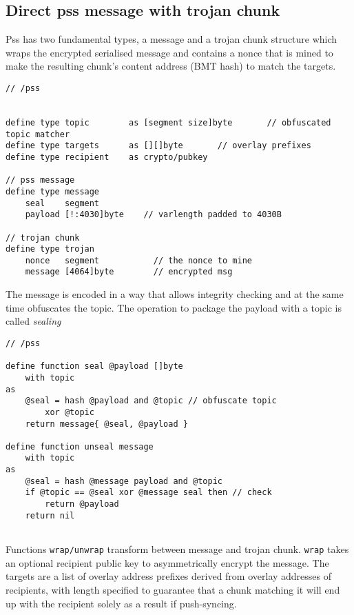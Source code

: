 \subsection{Direct pss message with trojan chunk}

Pss has two fundamental types, a message and a trojan chunk structure which wraps the encrypted serialised message and contains a nonce that is mined to make the resulting chunk's content address (BMT hash) to match the targets.


\begin{definition}\label{def:pss-message}
\begin{lstlisting}[language=buzz1]
// /pss


define type topic        as [segment size]byte       // obfuscated topic matcher
define type targets      as [][]byte       // overlay prefixes 
define type recipient    as crypto/pubkey

// pss message
define type message 
    seal    segment            
    payload [!:4030]byte    // varlength padded to 4030B
    
// trojan chunk
define type trojan 
    nonce   segment           // the nonce to mine 
    message [4064]byte        // encrypted msg 
\end{lstlisting}
\end{definition}


The message is encoded in a way that allows integrity checking and at the same time obfuscates the topic. The operation to package the payload with a topic is called \emph{sealing}


\begin{definition}\label{def:pss-sealing}
\begin{lstlisting}[language=buzz1]
// /pss

define function seal @payload []byte
    with topic
as
    @seal = hash @payload and @topic // obfuscate topic
        xor @topic          
    return message{ @seal, @payload }

define function unseal message
    with topic 
as
    @seal = hash @message payload and @topic 
    if @topic == @seal xor @message seal then // check 
        return @payload 
    return nil
    
\end{lstlisting}
\end{definition}

Functions \lstinline{wrap/unwrap} transform between message and trojan chunk. \lstinline{wrap} takes an optional recipient public key to asymmetrically encrypt the message.
The targets are a list of overlay address prefixes derived from overlay addresses of recipients, with length specified to guarantee that a chunk matching it will end up with the recipient solely as a result if  push-syncing.   

